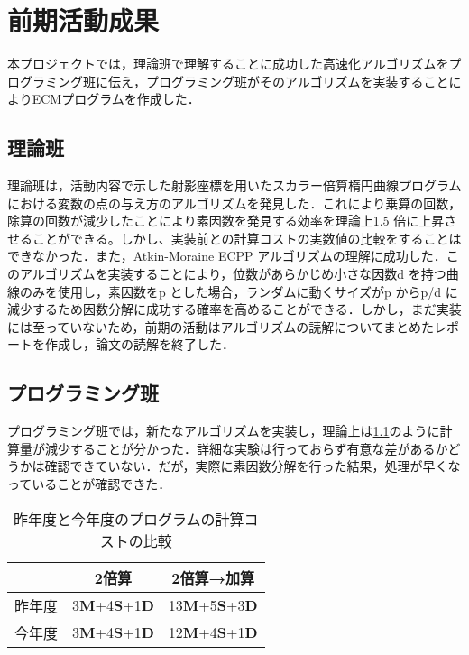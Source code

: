 \documentclass[openany,11pt,papersize]{jsbook}
\begin{document}
\chapter{前期活動成果}
本プロジェクトでは，理論班で理解することに成功した高速化アルゴリズムをプログラミング班に伝え，プログラミング班がそのアルゴリズムを実装することによりECMプログラムを作成した．


\section{理論班}
理論班は，活動内容で示した射影座標を用いたスカラー倍算楕円曲線プログラムにおける変数の点の与え方のアルゴリズムを発見した．これにより乗算の回数，除算の回数が減少したことにより素因数を発見する効率を理論上1.5 倍に上昇させることができる。しかし、実装前との計算コストの実数値の比較をすることはできなかった．また，Atkin-Moraine ECPP アルゴリズムの理解に成功した．このアルゴリズムを実装することにより，位数があらかじめ小さな因数d を持つ曲線のみを使用し，素因数をp とした場合，ランダムに動くサイズがp からp/d に減少するため因数分解に成功する確率を高めることができる\cite{SCIS1997}．しかし，まだ実装には至っていないため，前期の活動はアルゴリズムの読解についてまとめたレポートを作成し，論文の読解を終了した．


\section{プログラミング班}
プログラミング班では，新たなアルゴリズムを実装し，理論上は\ref{tab:cost}のように計算量が減少することが分かった．詳細な実験は行っておらず有意な差があるかどうかは確認できていない．だが，実際に素因数分解を行った結果，処理が早くなっていることが確認できた．

\begin{table}
\begin{center}
\caption{昨年度と今年度のプログラムの計算コストの比較}\label{tab:cost}
\begin{tabular}{ccc}
\hline
& 2倍算 & 2倍算→加算\\
\hline
昨年度 & 3{\bf M}+4{\bf S}+1{\bf D}\footnotemark & 13{\bf M}+5{\bf S}+3{\bf D}\\
今年度 & 3{\bf M}+4{\bf S}+1{\bf D} & 12{\bf M}+4{\bf S}+1{\bf D}\\
\hline
\end{tabular}
\end{center}
\end{table}
\end{document}
